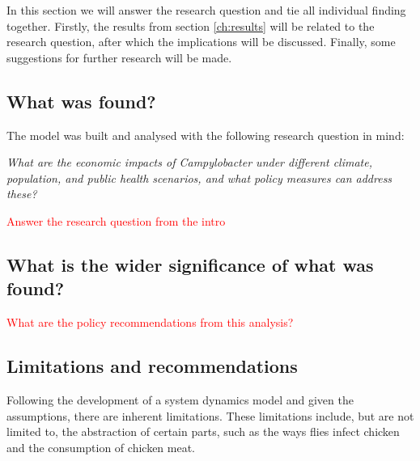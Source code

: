 In this section we will answer the research question and tie all individual finding together. Firstly, the results from section \ref{ch:results} will be related to the research question, after which the implications will be discussed. Finally, some suggestions for further research will be made. 

\subsection{What was found?}

The model was built and analysed with the following research question in mind: 

\begin{center}\textit{\textcolor{NiceBlue}{
What are the economic impacts of Campylobacter under different climate, population, and public health scenarios, and what policy measures can address these? }}
\end{center}


\textcolor{red}{Answer the research question from the intro}


\subsection{What is the wider significance of what was found?}
\textcolor{red}{What are the policy recommendations from this analysis?}


\subsection{Limitations and recommendations}

Following the development of a system dynamics model and given the assumptions, there are inherent limitations. These limitations include, but are not limited to, the abstraction of certain parts, such as the ways flies infect chicken and the consumption of chicken meat. 


